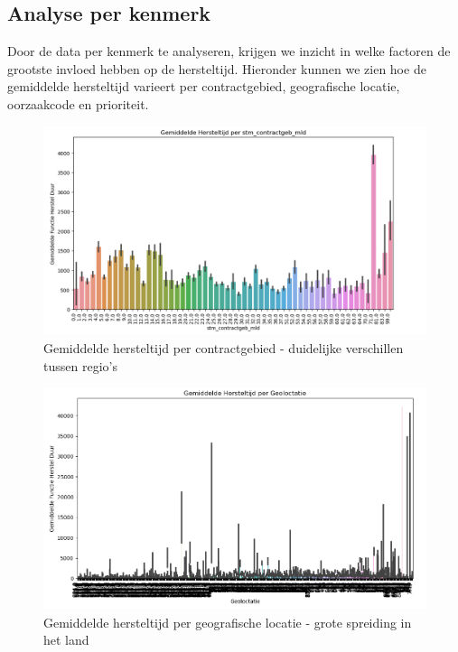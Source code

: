 \documentclass{article}
\begin{document}
\subsection{Analyse per kenmerk}
Door de data per kenmerk te analyseren, krijgen we inzicht in welke factoren de grootste invloed hebben op de hersteltijd. Hieronder kunnen we zien hoe de gemiddelde hersteltijd varieert per contractgebied, geografische locatie, oorzaakcode en prioriteit.

\begin{figure}[H]
    \centering
    \includegraphics[width=12cm]{contractgeb.png}
    \caption{Gemiddelde hersteltijd per contractgebied - duidelijke verschillen tussen regio's}
\end{figure}

\begin{figure}[H]
    \centering
    \includegraphics[width=12cm]{Geo.png}
    \caption{Gemiddelde hersteltijd per geografische locatie - grote spreiding in het land}
\end{figure}
\end{document}
